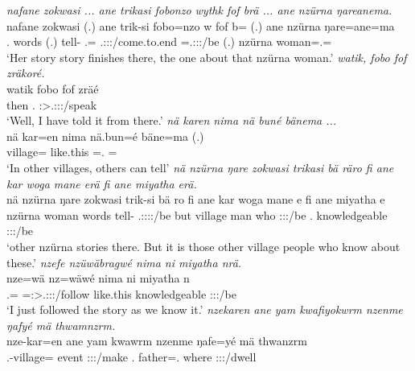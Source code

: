 \begin{exe}
	\emph{nafane zokwasi ... ane trikasi fobonzo wythk fof brä ... ane nzürna ŋareanema.}\\
	\gll nafane zokwasi (.) ane trik-si fobo=nzo w fof b= (.) ane nzürna ŋare=ane=ma\\
	\Tsg.{\Poss} words (.) {\Dem} tell-{\Nmlz} \Dist.\All={\Only} \Tsg.\F:\Sbj:\Nonpast:\Ipfv/come.to.end {\Emph} \Med=\Tsg.\F:\Sbj:\Nonpast:\Ipfv/be (.) {\Dem} nzürna woman=\Poss.\Sg={\Char}\\
	\trans `Her story story finishes there, the one about that nzürna woman.'
	\emph{watik, fobo fof zräkoré.}\\
	\gll watik fobo fof zräé\\
	then \Dist.{\All} {\Emph} \Fsg:\Sbj>\Tsg.\F:\Obj:\Irr:\Pfv/speak\\
	\trans `Well, I have told it from there.'
	\emph{nä karen nima nä buné bänema ...}\\
	\gll nä kar=en nima {nä.bun=é} bäne=ma (.)\\
	{\Indf} village={\Loc} like.this \Indf=\Erg.{\Nsg} \Recog={\Char}\\
	\trans `In other villages, others can tell'
	\emph{nä nzürna ŋare zokwasi trikasi bä räro fi ane kar woga mane erä fi ane miyatha erä.}\\
	\gll nä nzürna ŋare zokwasi trik-si bä ro fi ane kar woga mane e fi ane miyatha e\\
	{\Indf} nzürna woman words tell-{\Nmlz} \Med{} \Tsg.\F:\Sbj:\Nonpast:\Ipfv:\Andat/be but {\Dem} village man who \Stpl:\Sbj:\Nonpast:\Ipfv/be \Third.{\Abs} {\Dem} knowledgeable \Stpl:\Sbj:\Nonpast:\Ipfv/be\\
	\trans `other nzürna stories there. But it is those other village people who know about these.'
	\emph{nzefe nzüwäbragwé nima ni miyatha nrä.}\\
	\gll nze=wä nz=wäwé nima ni miyatha n\\
	\Fsg.\Erg={\Emph} \Immpst=\Fsg:\Sbj>\Tsg.\F:\Obj:\Nonpast:\Ipfv/follow like.this {\Fnsg} knowledgeable \Fpl:\Sbj:\Nonpast:\Ipfv/be\\
	\trans `I just followed the story as we know it.'
	\emph{nzekaren ane yam kwafiyokwrm nzenme ŋafyé mä thwamnzrm.}\\
	\gll nze-kar=en ane yam kwawrm nzenme ŋafe=yé mä thwanzrm\\
	\Fnsg.\Poss-village={\Loc} {\Dem} event \Sg:\Sbj:\Pst:\Dur/make \Fnsg.{\Poss} father=\Abs.{\Nsg} where \Stpl:\Sbj:\Pst:\Dur/dwell\\

\end{exe}
